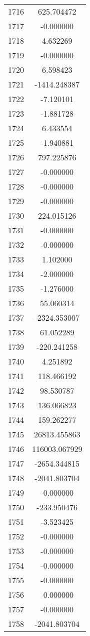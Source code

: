\documentclass[12pt]{article}
\begin{document}
\begin{longtable}{@{}cc@{}}
1716 & 625.704472 \\
1717 & -0.000000 \\
1718 & 4.632269 \\
1719 & -0.000000 \\
1720 & 6.598423 \\
1721 & -1414.248387 \\
1722 & -7.120101 \\
1723 & -1.881728 \\
1724 & 6.433554 \\
1725 & -1.940881 \\
1726 & 797.225876 \\
1727 & -0.000000 \\
1728 & -0.000000 \\
1729 & -0.000000 \\
1730 & 224.015126 \\
1731 & -0.000000 \\
1732 & -0.000000 \\
1733 & 1.102000 \\
1734 & -2.000000 \\
1735 & -1.276000 \\
1736 & 55.060314 \\
1737 & -2324.353007 \\
1738 & 61.052289 \\
1739 & -220.241258 \\
1740 & 4.251892 \\
1741 & 118.466192 \\
1742 & 98.530787 \\
1743 & 136.066823 \\
1744 & 159.262277 \\
1745 & 26813.455863 \\
1746 & 116003.067929 \\
1747 & -2654.344815 \\
1748 & -2041.803704 \\
1749 & -0.000000 \\
1750 & -233.950476 \\
1751 & -3.523425 \\
1752 & -0.000000 \\
1753 & -0.000000 \\
1754 & -0.000000 \\
1755 & -0.000000 \\
1756 & -0.000000 \\
1757 & -0.000000 \\
1758 & -2041.803704 \\

\end{longtable}
\end{document}
